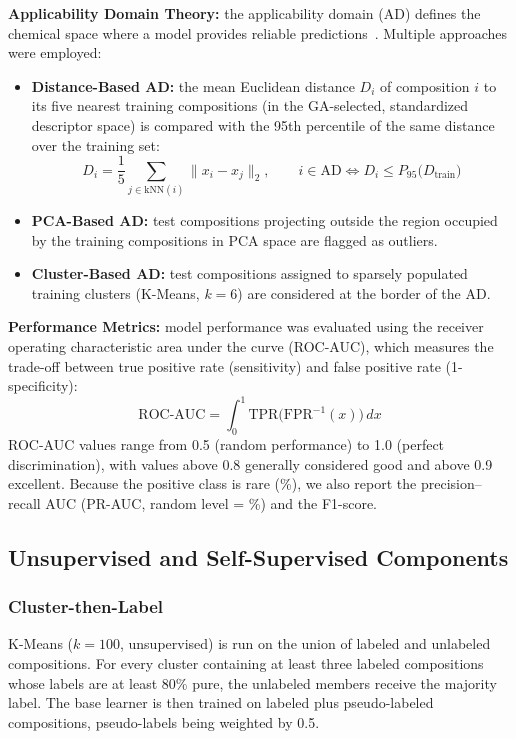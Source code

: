 \textbf{Applicability Domain Theory:} the applicability domain (AD) defines the chemical space
where a model provides reliable predictions~\cite{oecd}. Multiple approaches were employed:
\begin{itemize}
  \item \textbf{Distance-Based AD:} the mean Euclidean distance $D_i$ of composition $i$ to its
  five nearest training compositions (in the GA-selected, standardized descriptor space) is
  compared with the 95th percentile of the same distance over the training set:
  \[
  D_i = \frac{1}{5}\sum_{j \in \mathrm{kNN}(i)} \lVert x_i - x_j \rVert_2, \qquad
  i \in \text{AD} \iff D_i \le P_{95}\big(D_{\text{train}}\big)
  \]
  \item \textbf{PCA-Based AD:} test compositions projecting outside the region occupied by the
  training compositions in PCA space are flagged as outliers.
  \item \textbf{Cluster-Based AD:} test compositions assigned to sparsely populated training
  clusters (K-Means, $k = 6$) are considered at the border of the AD.
\end{itemize}

\textbf{Performance Metrics:} model performance was evaluated using the receiver operating
characteristic area under the curve (ROC-AUC), which measures the trade-off between true
positive rate (sensitivity) and false positive rate (1-specificity):
\[
\text{ROC-AUC} = \int_0^1 \text{TPR}\big(\text{FPR}^{-1}(x)\big)\,dx
\]
ROC-AUC values range from 0.5 (random performance) to 1.0 (perfect discrimination), with values
above 0.8 generally considered good and above 0.9 excellent. Because the positive class is
rare (\GapPos{}\%), we also report the precision--recall AUC (PR-AUC, random level =
\GapPos{}\%) and the F1-score.

\subsection{Unsupervised and Self-Supervised Components}

\subsubsection{Cluster-then-Label}
K-Means ($k=100$, unsupervised) is run on the union of labeled and unlabeled compositions. For
every cluster containing at least three labeled compositions whose labels are at least 80\%
pure, the unlabeled members receive the majority label. The base learner is then trained on
labeled plus pseudo-labeled compositions, pseudo-labels being weighted by 0.5.

